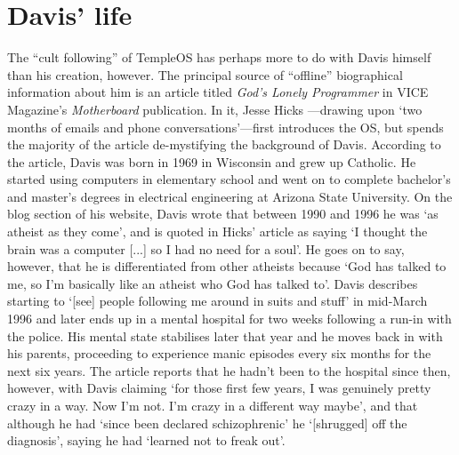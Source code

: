 \documentclass[Draft.tex]{subfiles}
\begin{document}
\section*{Davis' life}
The ``cult following'' of TempleOS has perhaps
more to do with Davis himself than his creation, however.
The principal source of ``offline'' biographical information about him is
an article titled \textit{God’s Lonely Programmer}
in VICE Magazine’s \textit{Motherboard} publication.
In it, Jesse Hicks \parencite*{Hicks14}---drawing
upon `two months of emails and phone conversations'---first
introduces the OS,
but spends the majority of the article de-mystifying the background of Davis.
According to the article,
Davis was born in 1969 in Wisconsin and grew up Catholic.
He started using computers in elementary school
and went on to complete bachelor's and master's degrees
in electrical engineering at Arizona State University.
On the blog section of his website, Davis \parencite*{Atheist} wrote that
between 1990 and 1996 he was `as atheist as they come',
and is quoted in Hicks' article as saying
`I thought the brain was a computer [...] so I had no need for a soul'.
He goes on to say, however, that he is differentiated from other atheists
because `God has talked to me,
so I'm basically like an atheist who God has talked to'.
Davis describes starting to
`[see] people following me around in suits and stuff' in mid-March 1996
and later ends up in a mental hospital for two weeks
following a run-in with the police.
His mental state stabilises later that year
and he moves back in with his parents,
proceeding to experience manic episodes every six months for the next six years.
The article reports that he hadn't been to the hospital since then, however,
with Davis claiming
`for those first few years, I was genuinely pretty crazy in a way.
Now I'm not. I'm crazy in a different way maybe',
and that although he had `since been declared schizophrenic' he
`[shrugged] off the diagnosis', saying he had `learned not to freak out'.
\end{document}
